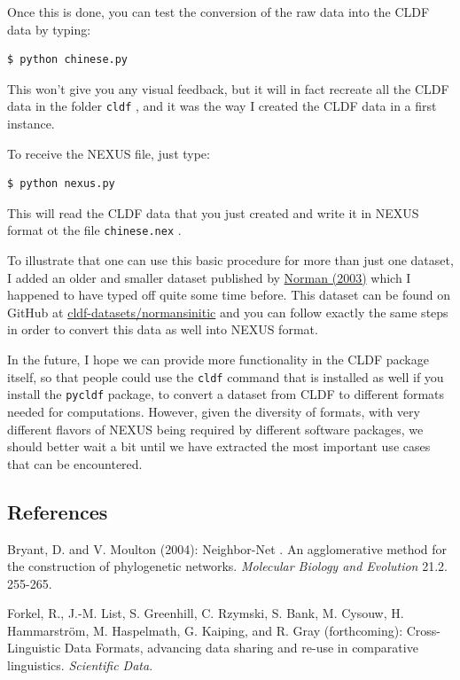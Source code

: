 \documentclass[
  a4paper,
  14pt,
  oneside,
  tablecaptionabove
]{scrbook}
\begin{document}
Once this is done, you can test the conversion of the raw data into the
CLDF data by typing:

\begin{lstlisting}[basicstyle=\small]
$ python chinese.py
\end{lstlisting}

This won't give you any visual feedback, but it will in fact recreate
all the CLDF data in the folder \lstinline!cldf! , and it was the way I
created the CLDF data in a first instance.

To receive the NEXUS file, just type:

\begin{lstlisting}[basicstyle=\small]
$ python nexus.py
\end{lstlisting}

This will read the CLDF data that you just created and write it in NEXUS
format ot the file \lstinline!chinese.nex! .

To illustrate that one can use this basic procedure for more than just
one dataset, I added an older and smaller dataset published by
\href{http://bibliography.lingpy.org?key=Normal2003}{Norman (2003)}
which I happened to have typed off quite some time before. This dataset
can be found on GitHub at
\href{https://github.com/cldf-datasets/normansinitic}{cldf-datasets/normansinitic}
and you can follow exactly the same steps in order to convert this data
as well into NEXUS format.

In the future, I hope we can provide more functionality in the CLDF
package itself, so that people could use the \lstinline!cldf! command
that is installed as well if you install the \lstinline!pycldf! package,
to convert a dataset from CLDF to different formats needed for
computations. However, given the diversity of formats, with very
different flavors of NEXUS being required by different software
packages, we should better wait a bit until we have extracted the most
important use cases that can be encountered.

\subsection*{References}

\nopagebreak\hangindent=0.7cm {\small Bryant, D. and V. Moulton (2004): {Neighbor-Net} {. An
agglomerative method for the construction of phylogenetic networks}. 
\emph{Molecular Biology and Evolution} 21.2. 255-265. }

\nopagebreak\hangindent=0.7cm {\small Forkel, R., J.-M. List, S. Greenhill, C. Rzymski, S. Bank, M. Cysouw,
H. Hammarström, M. Haspelmath, G. Kaiping, and R. Gray (forthcoming):
{Cross-Linguistic Data Formats, advancing data sharing and re-use
in comparative linguistics}.  \emph{Scientific Data}. }
\end{document}
